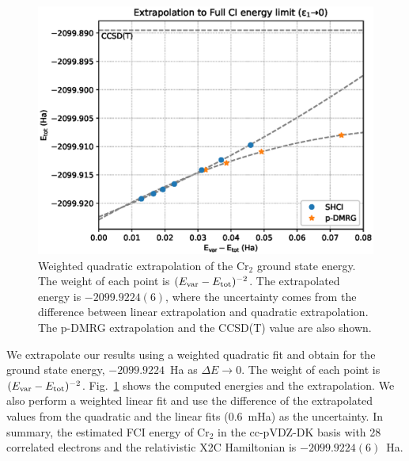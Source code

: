 \documentclass[%
reprint,
 superscriptaddress,
 amsmath,amssymb,
 aps,
]{revtex4-1}
\begin{document}
\begin{figure}
  \includegraphics[width=\linewidth]{extrapolation/extrapolate.eps}
  \caption{Weighted quadratic extrapolation of the Cr$_2$ ground state energy.
  The weight of each point is $(E_{\rm var} - E_{\rm tot})^{-2}$.
  The extrapolated energy is $-2099.9224(6)$, where the uncertainty comes from the difference between linear extrapolation and quadratic extrapolation.
  The p-DMRG extrapolation and the CCSD(T) value are also shown.
}
  \label{fig:extrapolation}
\end{figure}

We extrapolate our results using a weighted quadratic fit
and obtain for the ground state energy, $-2099.9224$~Ha as $\Delta E\to0$.
The weight of each point is $(E_{\rm var} - E_{\rm tot})^{-2}$.
Fig.~\ref{fig:extrapolation} shows the computed energies and the extrapolation.
We also perform a weighted linear fit and use the difference of the extrapolated values from the quadratic and the linear fits (0.6~mHa) as the uncertainty.
In summary, the estimated FCI energy of Cr$_2$ in the cc-pVDZ-DK basis with 28 correlated electrons and the relativistic X2C Hamiltonian
is $-2099.9224(6)$~Ha.
\end{document}
